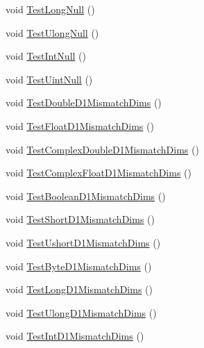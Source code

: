 \begin{DoxyCompactItemize}
void \mbox{\hyperlink{classkhiva_1_1array_1_1tests_1_1_array_tests_af130919038363a9a234129cf75becc70}{Test\+Long\+Null}} ()
\item 
void \mbox{\hyperlink{classkhiva_1_1array_1_1tests_1_1_array_tests_ad5ce01c3979fa00330064b2a596e2fb1}{Test\+Ulong\+Null}} ()
\item 
void \mbox{\hyperlink{classkhiva_1_1array_1_1tests_1_1_array_tests_a7968189cdde2726cdc6df15893fd79e9}{Test\+Int\+Null}} ()
\item 
void \mbox{\hyperlink{classkhiva_1_1array_1_1tests_1_1_array_tests_a30e0ae7b5c57d564271f1a7760c0b22a}{Test\+Uint\+Null}} ()
\item 
void \mbox{\hyperlink{classkhiva_1_1array_1_1tests_1_1_array_tests_a942a65f7082d8a9d24904bf6fa3d84d9}{Test\+Double\+D1\+Mismatch\+Dims}} ()
\item 
void \mbox{\hyperlink{classkhiva_1_1array_1_1tests_1_1_array_tests_a24feac7e30384a3d63dcd5174a520eed}{Test\+Float\+D1\+Mismatch\+Dims}} ()
\item 
void \mbox{\hyperlink{classkhiva_1_1array_1_1tests_1_1_array_tests_a822ec841cc21f98fd9181ec02ebdc1be}{Test\+Complex\+Double\+D1\+Mismatch\+Dims}} ()
\item 
void \mbox{\hyperlink{classkhiva_1_1array_1_1tests_1_1_array_tests_ada4b6639e164103a9695a18b03cbcfc8}{Test\+Complex\+Float\+D1\+Mismatch\+Dims}} ()
\item 
void \mbox{\hyperlink{classkhiva_1_1array_1_1tests_1_1_array_tests_a17c1b31e57ae68efc885969c1a646dda}{Test\+Boolean\+D1\+Mismatch\+Dims}} ()
\item 
void \mbox{\hyperlink{classkhiva_1_1array_1_1tests_1_1_array_tests_ac252e6c618c90768852e1fe20476ecde}{Test\+Short\+D1\+Mismatch\+Dims}} ()
\item 
void \mbox{\hyperlink{classkhiva_1_1array_1_1tests_1_1_array_tests_a6c9347b1e8962da19138e4abdb767b57}{Test\+Ushort\+D1\+Mismatch\+Dims}} ()
\item 
void \mbox{\hyperlink{classkhiva_1_1array_1_1tests_1_1_array_tests_a51e983afb16c3a167282e9a275e93abf}{Test\+Byte\+D1\+Mismatch\+Dims}} ()
\item 
void \mbox{\hyperlink{classkhiva_1_1array_1_1tests_1_1_array_tests_ad052f8f825eb514c93e1d0462b337fda}{Test\+Long\+D1\+Mismatch\+Dims}} ()
\item 
void \mbox{\hyperlink{classkhiva_1_1array_1_1tests_1_1_array_tests_a0027f28087b18a067a0f4452790a16f0}{Test\+Ulong\+D1\+Mismatch\+Dims}} ()
\item 
void \mbox{\hyperlink{classkhiva_1_1array_1_1tests_1_1_array_tests_a2b2e738e9a135f070734523334ed77bd}{Test\+Int\+D1\+Mismatch\+Dims}} ()

\end{DoxyCompactItemize}

